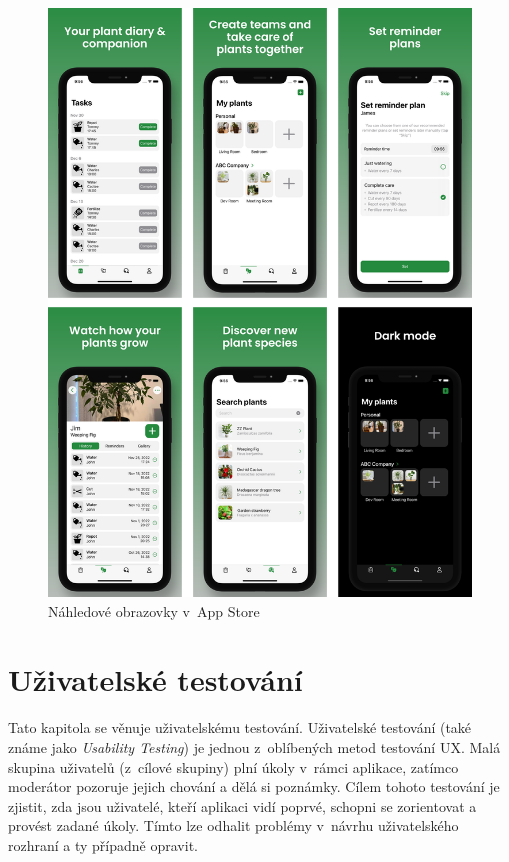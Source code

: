 \documentclass[thesis=M,czech]{FITthesis}[2019/12/23]
\begin{document}
\begin{figure}
	\centering
	\includegraphics[width=1\linewidth]{images/appstore-preview.png}
  	\caption{Náhledové obrazovky v~App Store}
  	\label{img:appstore-preview}
\end{figure}


\chapter{Uživatelské testování}
Tato kapitola se věnuje uživatelskému testování. Uživatelské testování (také známe jako \textit{Usability Testing}) je jednou z~oblíbených metod testování UX. Malá skupina uživatelů (z~cílové skupiny) plní úkoly v~rámci aplikace, zatímco moderátor pozoruje jejich chování a dělá si poznámky. Cílem tohoto testování je zjistit, zda jsou uživatelé, kteří aplikaci vidí poprvé, schopni se zorientovat a provést zadané úkoly. Tímto lze odhalit problémy v~návrhu uživatelského rozhraní a ty případně opravit.
\end{document}
